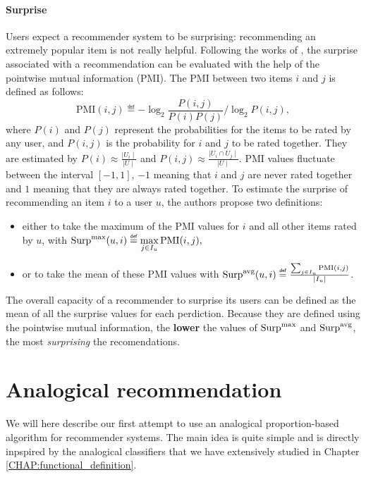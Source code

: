 \paragraph{Surprise\\}
Users expect a recommender system to be surprising: recommending an extremely
popular item is not really helpful. Following the works of
\cite{KamBriRecSys2014}, the surprise associated with a recommendation can be evaluated with
the help of the pointwise mutual information (PMI). The PMI between two items
$i$ and $j$ is defined as follows:
$$\text{PMI}(i, j) \eqdef -\log_2 \frac{P(i, j)}{P(i)P(j)} / \log_2 P(i, j),$$
where $P(i)$ and $P(j)$  represent the probabilities for the items to be rated
by any user, and $P(i, j)$ is the probability for $i$ and $j$ to be rated
together. They are estimated by $P(i) \approx \frac{\mid U_i \mid}{\mid U
\mid}$ and $P(i, j) \approx \frac{\mid U_i \cap U_j \mid}{\mid U\mid}$. PMI
values fluctuate between the interval $[-1, 1]$, $-1$ meaning that $i$ and $j$
are never rated together and $1$ meaning that they are always rated together.
To estimate the surprise of recommending an item $i$ to a user $u$, the authors
propose two definitions:
\begin{itemize}
\item either to take the maximum of the PMI values for $i$ and all other items
  rated by $u$, with $\surpmax(u, i) \eqdef \max\limits_{j\in I_u}
    \text{PMI}(i, j),$
\item
 or to take the mean of these PMI values with $\surpavg(u, i) \eqdef
    \frac{\sum_{j \in I_u} \text{PMI}(i, j)}{\mid I_u\mid }$.
\end{itemize}

The overall capacity of a recommender to surprise its users can be defined as
the mean of all the surprise values for each perdiction. Because they are
defined using the pointwise mutual information, the \textbf{lower} the values
of $\text{Surp}^{\text{max}}$ and $\text{Surp}^{\text{avg}}$, the most \textit{surprising} the recomendations.

\section{Analogical recommendation}
\label{sec:analogical_recommendation}

We will here describe our first attempt to use an analogical proportion-based
algorithm for recommender systems. The main idea is quite simple and is
directly inpspired by the analogical classifiers that we have extensively
studied in Chapter \ref{CHAP:functional_definition}.

